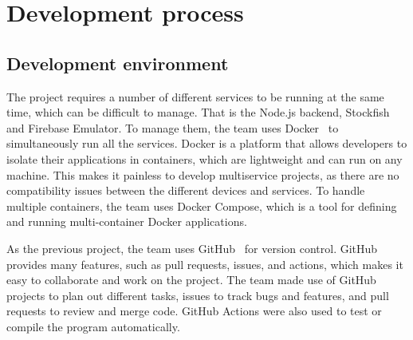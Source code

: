 \section{Development process}\label{sec:development-process}

\subsection{Development environment}\label{subsec:development}

The project requires a number of different services to be running at the same time, which can be difficult to manage.
That is the Node.js backend, Stockfish and Firebase Emulator.
To manage them, the team uses Docker~\cite{docker} to simultaneously run all the services.
Docker is a platform that allows developers to isolate their applications in containers, which are lightweight and can
run on any machine.
This makes it painless to develop multiservice projects, as there are no compatibility issues between the different
devices and services.
To handle multiple containers, the team uses Docker Compose, which is a tool for defining and running multi-container
Docker applications.

As the previous project, the team uses GitHub~\cite{github} for version control.
GitHub provides many features, such as pull requests, issues, and actions, which makes it easy to collaborate and work
on the project.
The team made use of GitHub projects to plan out different tasks, issues to track bugs and features, and pull requests
to review and merge code.
GitHub Actions were also used to test or compile the program automatically.
